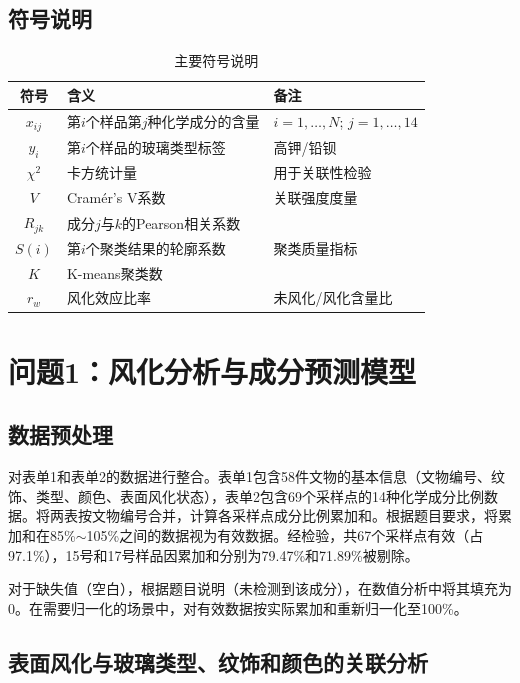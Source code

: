 \documentclass[12pt,a4paper]{ctexart}
\begin{document}
\subsection{符号说明}

\begin{table}[H]
\centering
\caption{主要符号说明}
\begin{tabular}{cll}
\toprule
\textbf{符号} & \textbf{含义} & \textbf{备注} \\
\midrule
$x_{ij}$ & 第$i$个样品第$j$种化学成分的含量 & $i=1,\dots,N$; $j=1,\dots,14$ \\
$y_i$ & 第$i$个样品的玻璃类型标签 & 高钾/铅钡 \\
$\chi^2$ & 卡方统计量 & 用于关联性检验 \\
$V$ & Cram\'{e}r's V系数 & 关联强度度量 \\
$R_{jk}$ & 成分$j$与$k$的Pearson相关系数 & \\
$S(i)$ & 第$i$个聚类结果的轮廓系数 & 聚类质量指标 \\
$K$ & K-means聚类数 & \\
$r_w$ & 风化效应比率 & 未风化/风化含量比 \\
\bottomrule
\end{tabular}
\end{table}

\section{问题1：风化分析与成分预测模型}

\subsection{数据预处理}

对表单1和表单2的数据进行整合。表单1包含58件文物的基本信息（文物编号、纹饰、类型、颜色、表面风化状态），表单2包含69个采样点的14种化学成分比例数据。将两表按文物编号合并，计算各采样点成分比例累加和。根据题目要求，将累加和在85\%$\sim$105\%之间的数据视为有效数据。经检验，共67个采样点有效（占97.1\%），15号和17号样品因累加和分别为79.47\%和71.89\%被剔除。

对于缺失值（空白），根据题目说明（未检测到该成分），在数值分析中将其填充为0。在需要归一化的场景中，对有效数据按实际累加和重新归一化至100\%。

\subsection{表面风化与玻璃类型、纹饰和颜色的关联分析}
\end{document}

